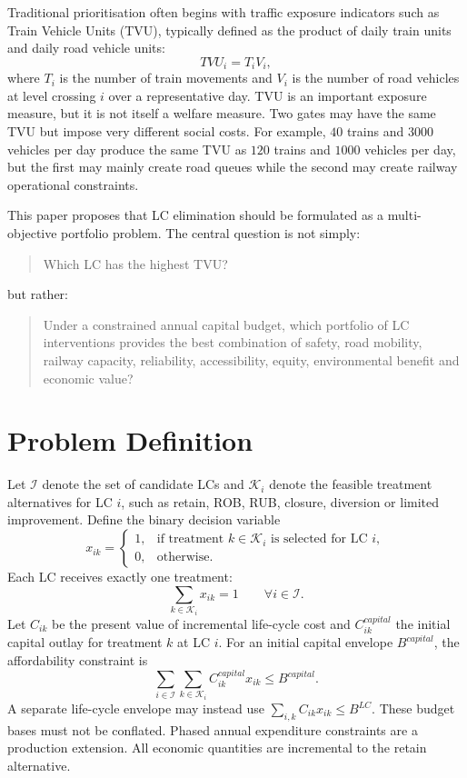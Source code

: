 \documentclass[11pt,a4paper]{article}
\begin{document}
Traditional prioritisation often begins with traffic exposure indicators such as Train Vehicle Units (TVU), typically defined as the product of daily train units and daily road vehicle units:
\begin{equation}
TVU_i = T_i V_i,
\end{equation}
where $T_i$ is the number of train movements and $V_i$ is the number of road vehicles at level crossing $i$ over a representative day. TVU is an important exposure measure, but it is not itself a welfare measure. Two gates may have the same TVU but impose very different social costs. For example, $40$ trains and $3000$ vehicles per day produce the same TVU as $120$ trains and $1000$ vehicles per day, but the first may mainly create road queues while the second may create railway operational constraints.

This paper proposes that LC elimination should be formulated as a multi-objective portfolio problem. The central question is not simply:
\begin{quote}
Which LC has the highest TVU?
\end{quote}
but rather:
\begin{quote}
Under a constrained annual capital budget, which portfolio of LC interventions provides the best combination of safety, road mobility, railway capacity, reliability, accessibility, equity, environmental benefit and economic value?
\end{quote}

\section{Problem Definition}

Let $\mathcal{I}$ denote the set of candidate LCs and $\mathcal{K}_i$ denote the feasible treatment alternatives for LC $i$, such as retain, ROB, RUB, closure, diversion or limited improvement. Define the binary decision variable
\begin{equation}
x_{ik}=\begin{cases}
1, & \text{if treatment } k \in \mathcal{K}_i \text{ is selected for LC } i,\\
0, & \text{otherwise.}
\end{cases}
\end{equation}
Each LC receives exactly one treatment:
\begin{equation}
\sum_{k\in\mathcal{K}_i} x_{ik}=1 \qquad \forall i\in\mathcal{I}.
\end{equation}
Let $C_{ik}$ be the present value of incremental life-cycle cost and $C_{ik}^{capital}$ the initial capital outlay for treatment $k$ at LC $i$. For an initial capital envelope $B^{capital}$, the affordability constraint is
\begin{equation}
\sum_{i\in\mathcal{I}}\sum_{k\in\mathcal{K}_i} C_{ik}^{capital}x_{ik}\leq B^{capital}.
\end{equation}
A separate life-cycle envelope may instead use $\sum_{i,k}C_{ik}x_{ik}\leq B^{LC}$. These budget bases must not be conflated. Phased annual expenditure constraints are a production extension. All economic quantities are incremental to the retain alternative.
\end{document}
